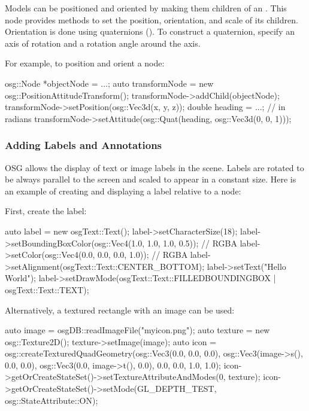 Models can be positioned and oriented by making them children of an
. This node provides methods to set the
position, orientation, and scale of its children. Orientation is done using
quaternions (). To construct a quaternion, specify an axis of
rotation and a rotation angle around the axis.

For example, to position and orient a node:

\begin{cpp}
osg::Node *objectNode = ...;
auto transformNode = new osg::PositionAttitudeTransform();
transformNode->addChild(objectNode);
transformNode->setPosition(osg::Vec3d(x, y, z));
double heading = ...; // in radians
transformNode->setAttitude(osg::Quat(heading, osg::Vec3d(0, 0, 1)));
\end{cpp}

\subsubsection{Adding Labels and Annotations}
\label{sec:graphics:osg-adding-labels-and-annotations}

OSG allows the display of text or image labels in the scene. Labels are rotated
to be always parallel to the screen and scaled to appear in a constant size.
Here is an example of creating and displaying a label relative to a node:

First, create the label:

\begin{cpp}
auto label = new osgText::Text();
label->setCharacterSize(18);
label->setBoundingBoxColor(osg::Vec4(1.0, 1.0, 1.0, 0.5)); // RGBA
label->setColor(osg::Vec4(0.0, 0.0, 0.0, 1.0)); // RGBA
label->setAlignment(osgText::Text::CENTER_BOTTOM);
label->setText("Hello World");
label->setDrawMode(osgText::Text::FILLEDBOUNDINGBOX | osgText::Text::TEXT);
\end{cpp}

Alternatively, a textured rectangle with an image can be used:

\begin{cpp}
auto image = osgDB::readImageFile("myicon.png");
auto texture = new osg::Texture2D();
texture->setImage(image);
auto icon = osg::createTexturedQuadGeometry(osg::Vec3(0.0, 0.0, 0.0),
    osg::Vec3(image->s(), 0.0, 0.0), osg::Vec3(0.0, image->t(), 0.0),
    0.0, 0.0, 1.0, 1.0);
icon->getOrCreateStateSet()->setTextureAttributeAndModes(0, texture);
icon->getOrCreateStateSet()->setMode(GL_DEPTH_TEST, osg::StateAttribute::ON);
\end{cpp}

